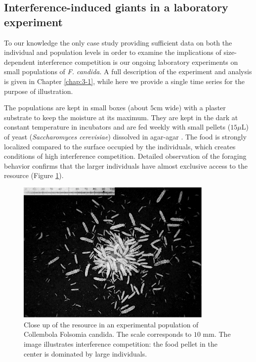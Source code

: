 \subsection{Interference-induced giants in a laboratory experiment}

To our knowledge the only case study providing sufficient data on both the
individual and population levels in order to examine the implications of
size-dependent interference competition is our ongoing laboratory experiments on
small populations of \textit{F. candida}. A full description of the experiment
and analysis is given in Chapter \ref{chap:3-1}, while here we
provide a single time series for the purpose of illustration.

The populations are kept in small boxes (about $5$cm wide) with a plaster
substrate to keep the moisture at its maximum. They are kept in the dark at
constant temperature in incubators and are fed weekly with small pellets
($15\mu$L) of yeast (\textit{Saccharomyces cerevisiae}) dissolved in agar-agar
\autocite{tully2005a,tully2008a}. The food is strongly localized compared to the
surface occupied by the individuals, which creates conditions of high
interference competition. Detailed observation of the foraging behavior confirms
that the larger individuals have almost exclusive access to the resource (Figure
\ref{Fig4-5}).

\begin{figure}[!h] %
\centering
\includegraphics[width=0.85\textwidth]{4_ChapThe1/Fig/Fig5.pdf} 
\caption[Close up of the resource]{ Close up
of the resource in an experimental population of Collembola Folsomia candida.
The scale corresponds to $10$ mm. The image illustrates interference
competition: the food pellet in the center is dominated by large individuals. }
\label{Fig4-5}
\end{figure}

